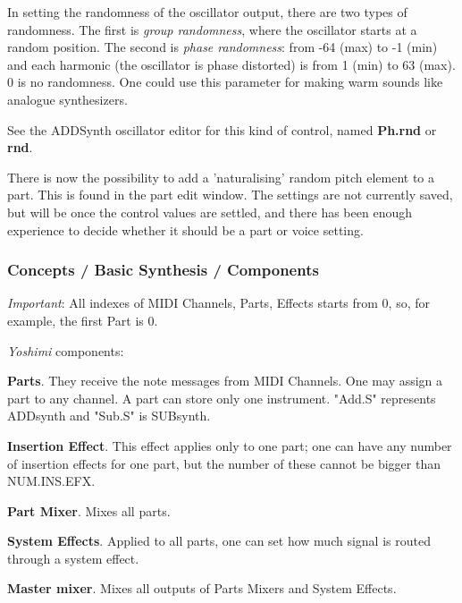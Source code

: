    In setting the randomness of the oscillator output, there are two types of
   randomness. The first is \textsl{group randomness}, where the oscillator
   starts at a random position. The second is \textsl{phase randomness}:
   from -64 (max) to -1 (min) and each harmonic (the oscillator is phase
   distorted) is from 1 (min) to 63 (max). 0 is no randomness. One
   could use this parameter for making warm sounds like analogue
   synthesizers.

   See the ADDSynth oscillator editor for this kind of
   control, named \textbf{Ph.rnd} or \textbf{rnd}.

   There is now the possibility to add a 'naturalising' random pitch element
   to a part. This is found in the part edit window. The settings are not
   currently saved, but will be once the control values are settled, and
   there has been enough experience to decide whether it should be a part or
   voice setting.

\subsubsection{Concepts / Basic Synthesis / Components}
\label{subsubsec:concepts_basics_components}

   \textsl{Important}:
   All indexes of MIDI Channels, Parts, Effects starts from 0, so, for
   example, the first Part is 0.

   \textsl{Yoshimi} components:

   \begin{enumber}
      \item \textbf{Parts}.
         They receive the note messages from MIDI
         Channels. One may assign a part to any channel. A part can store
         only one instrument.  "Add.S" represents ADDsynth and "Sub.S" is
         SUBsynth.
      \item \textbf{Insertion Effect}.
         This effect applies only to one part; one can have any number of
         insertion effects for one part, but the number of these cannot be
         bigger than NUM.INS.EFX.
      \item \textbf{Part Mixer}.
         Mixes all parts.
      \item \textbf{System Effects}.
         Applied to all parts, one can set how much signal
         is routed through a system effect.
      \item \textbf{Master mixer}.
         Mixes all outputs of Parts Mixers and System Effects.
   \end{enumber}

